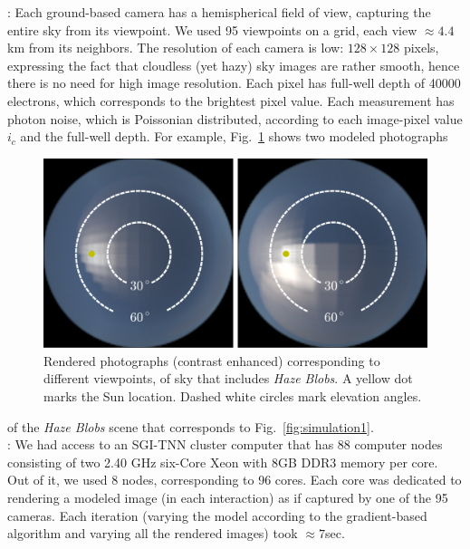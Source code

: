 \documentclass[10pt,twocolumn,letterpaper]{article}
\newcommand{\yoavcomment}[1]{}
\renewcommand{\yoavcomment}[1]{#1} %
\begin{document}
: Each ground-based camera has a hemispherical field of view, capturing the entire sky from its viewpoint. We used 95 viewpoints on a grid, each view $\approx 4.4$km from its neighbors.
The resolution of each camera is low: $128\times 128$ pixels, expressing the fact that cloudless (yet hazy) sky images are rather smooth, hence there is no need for high image resolution. Each pixel has full-well depth of 40000 electrons, which corresponds to the brightest pixel value. Each measurement has photon noise, which is Poissonian distributed, according to each image-pixel value $i_c$ and the full-well depth. For example, Fig.~\ref{fig:simulation-results1} shows two modeled photographs
\begin{figure}
  \centering
  \yoavcomment{\includegraphics[width=\columnwidth]{images/ref_images.pdf}}
  \caption{\small Rendered photographs (contrast enhanced) corresponding
   to different viewpoints, of sky that includes {\em Haze Blobs}. A yellow dot marks
    the Sun location. Dashed white circles mark elevation angles.}
  \label{fig:simulation-results1}
\end{figure}
of the  {\em Haze Blobs} scene that corresponds to Fig.~\ref{fig:simulation1}.\\


: We had access to an SGI-TNN cluster computer that has 88 computer nodes consisting of two 2.40 GHz six-Core Xeon with 8GB
DDR3 memory per core. Out of it, we used 8 nodes, corresponding to 96 cores. Each core was dedicated to rendering a modeled image (in each interaction) as if captured by one of the 95 cameras. Each iteration (varying the model according to the gradient-based algorithm and varying all the rendered images) took $\approx 7$sec.\\
\end{document}
